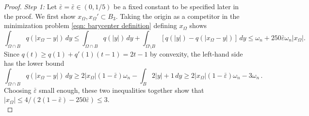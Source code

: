 \documentclass[10pt, reqno]{amsart}
\numberwithin{equation}{section}
\def\e{\varepsilon}
\def\w{\omega}
\def\W{\Omega}
\def\baryEps{\bar{\e}}
\def\TBF{q}
\begin{document}
\begin{proof}
{\it Step 1:}	Let $\baryEps=\baryEps\in(0,1/5)$ be a fixed constant to be specified later in the proof. We first show $x_\W, x_\W' \subset B_3$. Taking the origin as a competitor in the minimization problem \eqref{eqn: barycenter definition} defining $x_\W$ shows 
	\[
	\int_{\W \cap B} \TBF(|x_\W-y|)\,dy \leq \int_{\W \cap B} \TBF(|y|)\,dy +  \int_{\W \setminus B} [ \TBF(|y|) - \TBF(|x_\W-y|) ] \,dy\leq \w_n + 250 \baryEps \omega_n |x_\W|.
	\]
Since $\TBF(t) \geq \TBF(1)+ \TBF'(1)(t-1) = 2t-1$ by convexity, the left-hand side has the lower bound
\[
\int_{\W \cap B} \TBF(|x_\W-y|)\,dy \geq 2|x_\W|(1-\baryEps) \omega_n - \int_{B} 2|y|+1 \, dy \geq 2|x_\W|(1-\baryEps) \omega_n - 3\omega_n\,.
\]
Choosing $\baryEps$ small enough, these two inequalities together show that $|x_\W| \leq 4/(2(1-\baryEps) -250\baryEps) \leq 3.$\\


\end{proof}
\end{document}
